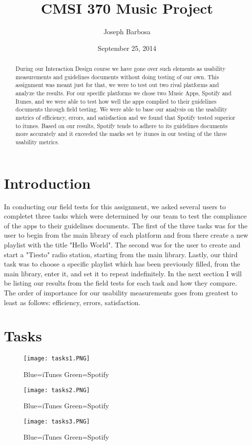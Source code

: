 \documentclass[a4paper]{article}
\title{CMSI 370 Music Project}
\author{Joseph Barbosa}
\date{September 25, 2014}
\begin{document}
\maketitle

\begin{abstract}
During our Interaction Design course we have gone over such elements as usability measurements and guidelines documents without doing testing of our own. This assignment was meant just for that, we were to test out two rival platforms and analyze the results. For our specific platforms we chose two Music Apps, Spotify and Itunes, and we were able to test how well the apps complied to their guidelines documents through field testing. We were able to base our analysis on the usability metrics of efficiency, errors, and satisfaction and we found that Spotify tested superior to itunes. Based on our results, Spotify tends to adhere to its guidelines documents more accurately and it exceeded the marks set by itunes in our testing of the three usability metrics.
\end{abstract}

\section{Introduction}

In conducting our field tests for this assignment, we asked several users to completet three tasks which were determined by our team to test the compliance of the apps to their guidelines documents. The first of the three tasks was for the user to begin from the main library of each platform and from there create a new playlist with the title "Hello World". The second was for the user to create and start a "Tiesto" radio station, starting from the main library. Lastly, our third task was to choose a specific playlist which has been previously filled, from the main library, enter it, and set it to repeat indefinitely. In the next section I will be listing our results from the field tests for each task and how they compare. The order of importance for our usability measurements goes from greatest to least as follows: efficiency, errors, satisfaction.



\section{Tasks}
\label{sec:tasks}

\begin{figure}[H]
\centering
\texttt{[image: tasks1.PNG]}
\caption{\label{task:tasks1.1}Blue=iTunes  Green=Spotify}
\end{figure}
\begin{figure}[H]
\centering
\texttt{[image: tasks2.PNG]}
\caption{\label{task:tasks1.2}Blue=iTunes  Green=Spotify}
\end{figure}
\begin{figure}[H]
\centering
\texttt{[image: tasks3.PNG]}
\caption{\label{task:tasks1.3}Blue=iTunes  Green=Spotify}
\end{figure}
\end{document}
